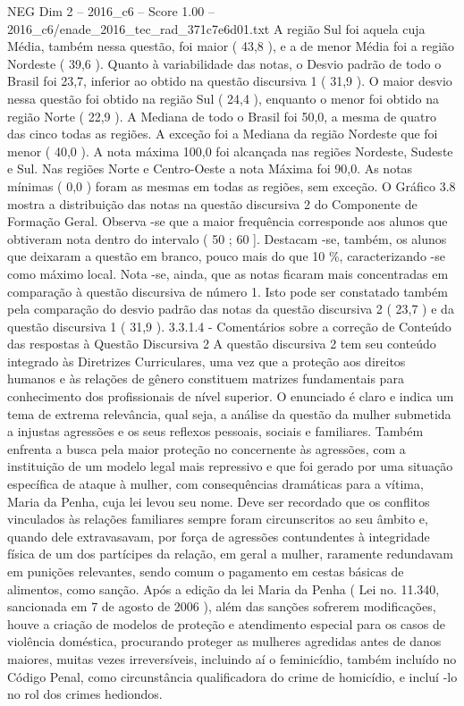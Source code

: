\begin{textsample}{NEG Dim 2 – 2016\_c6 – Score 1.00 – 2016\_c6/enade\_2016\_tec\_rad\_371c7e6d01.txt}
A região Sul foi aquela cuja Média, também nessa questão, foi maior ( 43,8 ), e a de menor Média foi a região Nordeste ( 39,6 ).
Quanto à variabilidade das notas, o Desvio padrão de todo o Brasil foi 23,7, inferior ao obtido na questão discursiva 1 ( 31,9 ).
O maior desvio nessa questão foi obtido na região Sul ( 24,4 ), enquanto o menor foi obtido na região Norte ( 22,9 ).
A Mediana de todo o Brasil foi 50,0, a mesma de quatro das cinco todas as regiões.
A exceção foi a Mediana da região Nordeste que foi menor ( 40,0 ).
A nota máxima 100,0 foi alcançada nas regiões Nordeste, Sudeste e Sul.
Nas regiões Norte e Centro-Oeste a nota Máxima foi 90,0.
As notas mínimas ( 0,0 ) foram as mesmas em todas as regiões, sem exceção.
O Gráfico 3.8 mostra a distribuição das notas na questão discursiva 2 do Componente de Formação Geral.
Observa -se que a maior frequência corresponde aos alunos que obtiveram nota dentro do intervalo ( 50 ; 60 ].
Destacam -se, também, os alunos que deixaram a questão em branco, pouco mais do que 10 \%, caracterizando -se como máximo local.
Nota -se, ainda, que as notas ficaram mais concentradas em comparação à questão discursiva de número 1.
Isto pode ser constatado também pela comparação do desvio padrão das notas da questão discursiva 2 ( 23,7 ) e da questão discursiva 1 ( 31,9 ). 3.3.1.4 - Comentários sobre a correção de Conteúdo das respostas à Questão Discursiva 2 A questão discursiva 2 tem seu conteúdo integrado às Diretrizes Curriculares, uma vez que a proteção aos direitos humanos e às relações de gênero constituem matrizes fundamentais para conhecimento dos profissionais de nível superior.
O enunciado é claro e indica um tema de extrema relevância, qual seja, a análise da questão da mulher submetida a injustas agressões e os seus reflexos pessoais, sociais e familiares.
Também enfrenta a busca pela maior proteção no concernente às agressões, com a instituição de um modelo legal mais repressivo e que foi gerado por uma situação específica de ataque à mulher, com consequências dramáticas para a vítima, Maria da Penha, cuja lei levou seu nome.
Deve ser recordado que os conflitos vinculados às relações familiares sempre foram circunscritos ao seu âmbito e, quando dele extravasavam, por força de agressões contundentes à integridade física de um dos partícipes da relação, em geral a mulher, raramente redundavam em punições relevantes, sendo comum o pagamento em cestas básicas de alimentos, como sanção.
Após a edição da lei Maria da Penha ( Lei no. 11.340, sancionada em 7 de agosto de 2006 ), além das sanções sofrerem modificações, houve a criação de modelos de proteção e atendimento especial para os casos de violência doméstica, procurando proteger as mulheres agredidas antes de danos maiores, muitas vezes irreversíveis, incluindo aí o feminicídio, também incluído no Código Penal, como circunstância qualificadora do crime de homicídio, e incluí -lo no rol dos crimes hediondos.

\end{textsample}
